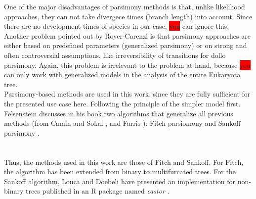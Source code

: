       One of the major disadvantages of parsimony methods is that, unlike likelihood approaches, they 
        can not take divergece times (branch length) into account. Since there are no development times 
        of species in our case, \colorbox{red}{you} can ignore this. \\
      Another problem pointed out by Royer-Carenzi is that parsimony approaches are either based on 
        predefined parameters (generalized parsimony) or on strong and often controversial assumptions, 
        like irreversibility of transitions for dollo parsimony. Again, this problem is irrelevant to 
        the problem at hand, because \colorbox{red}{you} can only work with generalized models in the 
        analysis of the entire Eukaryota tree. \\

      Parsimony-based methods are used in this work, since they are fully sufficient for the presented 
        use case here. Following the principle of the simpler model first. \\
      Felsenstein \cite{Felsenstein2003} discusses in his book two algorithms that generalize all 
        previous methods (from Camin and Sokal \cite{Camin1965},  and Farris 
        \cite{Farris1970}): Fitch parsiomony \cite{Fitch1971} and Sankoff parsimony \cite{Sankoff1975}. \\
       \\
       \\
      
      Thus, the methods used in this work are those of Fitch and Sankoff. For Fitch, the algorithm has 
        been extended from binary to multifurcated trees. For the Sankoff algorithm, Louca and Doebeli 
        have presented an implementation for non-binary trees published in an R package named 
        \textit{castor} \cite{Louca2017}.

